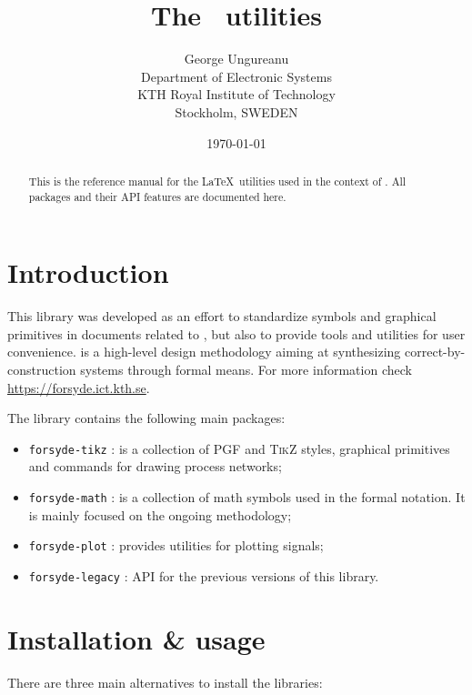 \documentclass[10pt]{article}
\title{The \ForSyDeLaTeX\ utilities}
\author{
  George Ungureanu \\
  Department of Electronic Systems\\
  KTH Royal Institute of Technology\\
  Stockholm, SWEDEN
}
\date{\today}
\begin{document}
\maketitle
\reversemarginpar

\begin{abstract}
This is the reference manual for the \LaTeX\ utilities used in the context of \ForSyDe. All packages and their API features are documented here.
\end{abstract}

\section{Introduction}

This library was developed as an effort to standardize symbols and graphical primitives in documents related to \ForSyDe, but also to provide tools and utilities for user convenience. \ForSyDe is a high-level design methodology aiming at synthesizing correct-by-construction systems through formal means. For more information check \url{https://forsyde.ict.kth.se}.

The library contains the following main packages:
\begin{itemize}
\item \texttt{forsyde-tikz} : is a collection of \textsc{PGF} and \textsc{TikZ} styles, graphical primitives and commands for drawing \ForSyDe process networks;
\item \texttt{forsyde-math} : is a collection of math symbols used in the \ForSyDe formal notation. It is mainly focused on the ongoing \ForSyDeAtom methodology;
\item \texttt{forsyde-plot} : provides utilities for plotting \ForSyDe signals;
\item \texttt{forsyde-legacy} : API for the previous versions of this library.
\end{itemize}

\section{Installation \& usage}

There are three main alternatives to install the libraries:
\end{document}
